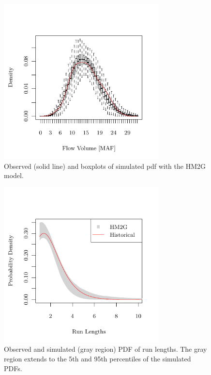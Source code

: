 \documentclass[wrr]{AGUTeX}
\begin{document}
\begin{figure}
\centering
\noindent\includegraphics[width=20pc]{plots/hmm-sim-figure4.pdf}
\caption{Observed (solid line) and boxplots of simulated pdf with the HM2G model.}\label{fig:density}
\end{figure}

\begin{figure}
\centering
\noindent\includegraphics[width=20pc]{plots/hmm-sim-figure5.pdf}
\caption{Observed and simulated (gray region) PDF of run lengths.  The gray region extends to the 5th and 95th percentiles of the simulated PDFs.}\label{fig:sim-length}
\end{figure}
\end{document}
